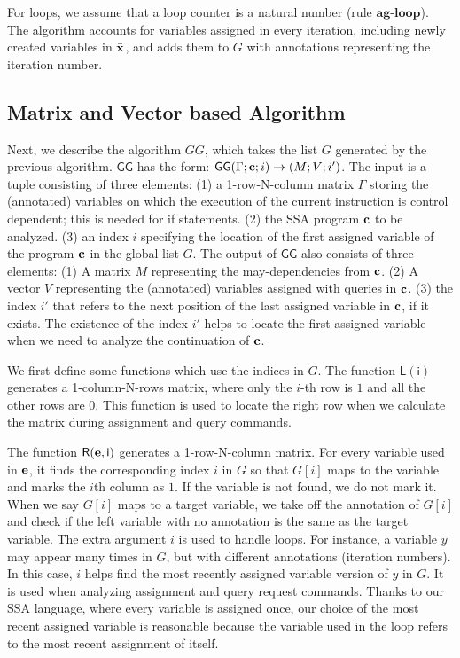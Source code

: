 For loops, we assume that a loop counter is a natural number (rule 
$\textbf{ag-loop}$). The algorithm accounts for variables assigned in every iteration, including newly created variables in $\bar{{\bf{{x}}}}$, and adds them to $G$ with annotations representing the iteration number. 

\subsection{Matrix and Vector based Algorithm}
Next, we describe the algorithm $GG$, which takes the list $G$ generated by the previous algorithm. $\mathsf{GG}$ has the form: $ \mathsf{GG}{(\Gamma; {\bf{{c}}} ;i )}\to {( M; V;  i' )} $. The input is a tuple consisting of three elements: (1) a 1-row-N-column matrix $\Gamma$ storing the (annotated) variables on which the execution of the current instruction is control dependent; this is needed for if statements. (2) the SSA program ${\bf{{c}}}$ to be analyzed. (3) an index $i$ specifying the location of the first assigned variable of the program ${\bf{{c}}}$ in the global list $G$. The output of $\mathsf{GG}$ also consists of three elements: (1) A matrix $M$ representing the may-dependencies from ${\bf{{c}}}$. (2) A vector $V$ representing the (annotated) variables assigned with queries in ${\bf{{c}}}$. (3) the index $i'$ that refers to the next position of the last assigned variable in ${\bf{{c}}}$, if it exists. The existence of the index $i'$ helps to locate the first assigned variable when we need to analyze the continuation of ${\bf{{c}}}$.  

We first define some functions which use the indices in $G$. 
The function $\mathsf{L(i)}$ generates a 1-column-N-rows  matrix, where only the $i$-th row is $1$ and all the other rows are $0$. This function is used to locate the right row when we calculate the matrix during assignment and query commands. 

The function $\mathsf{R({\bf{{e}}}, i)}$ generates a 1-row-N-column matrix. For every variable used in ${\bf{{e}}}$, it finds the corresponding index $i$ in $G$ so that $G[i]$ maps to the variable and marks the $i$th column as $1$. If the variable is not found, we do not mark it. When we say $G[i]$ maps to a target variable, we take off the annotation of $G[i]$ and check if the left variable with no annotation is the same as the target variable. The extra argument $i$ is used to handle loops. For instance, a variable $y$ may appear many times in $G$, but with different annotations (iteration numbers). In this case, $i$ helps find the most recently assigned variable version of $y$ in $G$. It is used when analyzing assignment and query request commands. Thanks to our SSA language, where every variable is assigned once, our choice of the most recent assigned variable is reasonable because the variable used in the loop refers to the most recent assignment of itself. 

